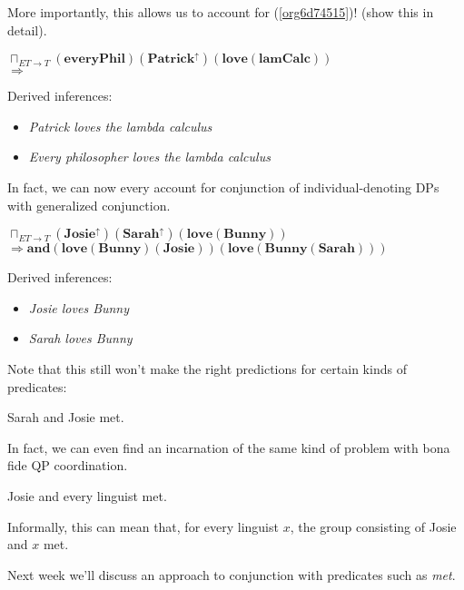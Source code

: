 \documentclass[letterpaper,parskip=half]{scrartcl}
\begin{document}
More importantly, this allows us to account for (\ref{org6d74515})! (show this in detail).

\begin{exe}
\ex \(\sqcap_{ET \to T}(\mathbf{everyPhil})(\mathbf{Patrick}^{\uparrow})(\mathbf{love}(\mathbf{lamCalc}))\)\\
\(\Rightarrow\)
\label{orga641d1c}
\end{exe}

Derived inferences:

\begin{itemize}
\item \emph{Patrick loves the lambda calculus}
\item \emph{Every philosopher loves the lambda calculus}
\end{itemize}

In fact, we can now every account for conjunction of individual-denoting DPs with generalized conjunction.

\begin{exe}
\ex \(\sqcap_{ET \to T}(\mathbf{Josie}^\uparrow)(\mathbf{Sarah}^\uparrow)(\mathbf{love}(\mathbf{Bunny}))\)\\
\(\Rightarrow \mathbf{and}(\mathbf{love}(\mathbf{Bunny})(\mathbf{Josie}))(\mathbf{love}(\mathbf{Bunny}(\mathbf{Sarah})))\)
\label{org7673ca3}
\end{exe}

Derived inferences:

\begin{itemize}
\item \emph{Josie loves Bunny}
\item \emph{Sarah loves Bunny}
\end{itemize}

Note that this still won't make the right predictions for certain kinds of predicates:

\begin{exe}
\ex Sarah and Josie met.
\label{org9862da9}
\end{exe}

In fact, we can even find an incarnation of the same kind of problem with bona fide QP coordination.

\begin{exe}
\ex Josie and every linguist met.
\label{org95015c2}
\end{exe}

Informally, this can mean that, for every linguist \(x\), the group consisting of Josie and \(x\) met.

Next week we'll discuss an approach to conjunction with predicates such as \emph{met}.

\printbibliography
\end{document}
